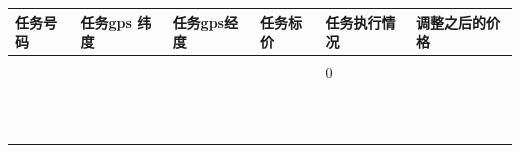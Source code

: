 \documentclass{ctexart}
\begin{document}
\newpage
\begin{table}[!h]\center\scriptsize
\begin{tabular}{|l|l|l|l|l|l|}
\hline

任务号码&	任务gps 纬度	&任务gps经度&	任务标价&	任务执行情况&	调整之后的价格\\
\hline
{\color{red}{A0001}}&	{\color{red}{22.56614225}}&	{\color{red}{113.9808368}}&{\color{red}{66}}	&{\color{red}{0}}	&{\color{red}{68.362}}\\
\hline
{\color{red}{A0002}}&	{\color{red}{22.68620526}}&	{\color{red}{113.940525 2}}&	{\color{red}{65.5}}&	0&	{\color{red}{69.424}}\\
\hline
{\color{blue}{A0003}}&	{\color{blue}{22.57651183}}&	{\color{blue}{113.957198}}&	{\color{blue}{65.5}}	&{\color{blue}{1}}	&{\color{blue}{64.809}}\\
\hline
{\color{green}{A0004}}&	{\color{green}{22.56484081}}&	{\color{green}{114.2445711}}&	{\color{green}{75}}	&{\color{green}{0	}}&{\color{green}{75}}\\
\hline
{\color{red}{A0005}}&	{\color{red}{22.55888775}}&	{\color{red}{113.9507227}}&	{\color{red}{65.5}}&	{\color{red}{0}}&{\color{red}{67.771}}\\
\hline
{\color{green}{A0006}}&{\color{green}{22.55899906}}&	{\color{green}{114.2413174}}&	{\color{green}{75	}}&{\color{green}{0}}	&{\color{green}{75}}\\
\hline
{\color{green}{A0007}}&{\color{green}{22.54900371}}&	{\color{green}{113.9722597}}	&{\color{green}{65.5}}	&{\color{green}{1}}	&{\color{green}{65.5}}\\
\hline
{\color{red}{A0008}}&	{\color{red}{22.56277351}}&	{\color{red}{113.9565735}}	&{\color{red}{65.5	}}&{\color{red}{0	}}&{\color{red}{66.716}}\\
\hline
{\color{red}{A0009}}&	{\color{red}{22.50001192}}&{\color{red}{113.8956606	}}	&{\color{red}{66}}	&{\color{red}{0}}	&{\color{red}{69.065}}\\
\hline
\color{blue}{A0010}&	{\color{blue}{22.5437861}}&	{\color{blue}{113.9239778}}&{\color{blue}{66}}	&{\color{blue}{1}}	&{\color{blue}{65.711}}\\
\hline
{\color{red}{A0011}}&	{\color{red}{22.52486369	}}&{\color{red}{113.9308596}}&	{\color{red}{65.5	}}&{\color{red}{0}}&	{\color{red}{67.713}}\\
\hline
{\color{red}{A0012}}&	\color{red}{22.519087}&{\color{red}{113.9358436}}&{\color{red}{	65.5}}	&{\color{red}{0}}&	{\color{red}{68.416}}\\
\hline
{\color{green}{A0013}}&	{\color{green}{22.54797243}}&{\color{green}{113.977909}}&	{\color{green}{65.5}}	&{\color{green}{1}}&{\color{green}{65.5}}\\
\hline


\end{tabular}
\end{table}
\end{document}
